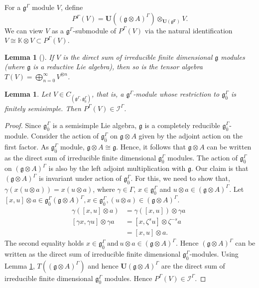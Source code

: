 \documentclass[11pt]{amsart}
\theoremstyle{plain}
\newtheorem{lemma}[thm]{Lemma}
\theoremstyle{definition}
\newcommand{\g}{\mathfrak{g}}
\begin{document}
 For a $\g^{\Gamma}$ module $V$, define 
 \begin{equation}
     P{^\Gamma}(V)=\mathbf{U}((\g\otimes A)^\Gamma)\otimes_{\mathbf{U(\g^{\Gamma})}}V. 
 \end{equation}
 We can view $V$ as a $\g^{\Gamma}$-submodule of $P^\Gamma(V)$ via the natural identification $V\cong \mathbb{K}\otimes V\subset P^\Gamma(V)$.
\begin{lemma}[\cite{FMS15}]\label{lem:14}
If $V$ is the direct sum of irreducible finite dimensional $\g$ modules (where $\g$ is a reductive Lie algebra), then so is the tensor algebra $T(V)=\bigoplus_{n=0}^{\infty}V^{\otimes n}$.
\end{lemma}
 \begin{lemma}
 Let $V\in C_{(\g^{\Gamma},\g_{\bar{0}}^{\Gamma})}$, that is, a  $\g^{\Gamma}$-module whose restriction to $\g_{\bar{0}}^{\Gamma}$ is finitely semisimple. Then $P^\Gamma(V)\in\mathcal{I}^\Gamma$. 
 \end{lemma}
 \begin{proof}
Since $\g_{\bar{0}}^{\Gamma}$ is a semisimple Lie algebra, $\g$ is a completely reducible $\g_{\bar{0}}^{\Gamma}$-module. Consider the action of $\g_{\bar{0}}^{\Gamma}$ on $\g\otimes A$ given by the adjoint action on the first factor. As $\g_{\bar{0}}^{\Gamma}$ module, $\g\otimes A\cong\g$. Hence, it follows that $\g\otimes A$ can be written as the direct sum of irreducible finite dimensional $\g_{\bar{0}}^{\Gamma}$ modules. The action of $\g_{\bar{0}}^{\Gamma}$ on $(\g\otimes A)^{\Gamma}$ is also by the left adjoint multiplication with $\g$. Our claim is that $(\g\otimes A)^\Gamma$ is invariant under action of $\g_{\bar{0}}^{\Gamma}$. For this, we need to show that, $\gamma(x(u\otimes a))=x(u\otimes a)$, where $\gamma\in\Gamma$, $x\in\g_{\bar{0}}^{\Gamma}$ and $u\otimes a\in (\g\otimes A)^{\Gamma}$. Let $[x,u]\otimes a\in\g_{\bar{0}}^{\Gamma}(\g\otimes A)^{\Gamma},  x\in\g_{\bar{0}}^{\Gamma}, (u\otimes a)\in(\g\otimes A)^{\Gamma}$.
\begin{align*}
  \gamma([x,u]\otimes a)&=\gamma([x,u])\otimes\gamma a \\
  [\gamma x,\gamma u]\otimes\gamma a&=[x,\zeta^{s}u]\otimes\zeta^{-s}a\quad \\
  &=[x,u]\otimes a.
\end{align*}
The second equality holds $x\in\g_{\bar{0}}^{\Gamma}~\mbox{and}~u\otimes a\in(\g\otimes A)^{\Gamma}$.
Hence $(\g\otimes A)^{\Gamma}$ can be written as the direct sum of irreducible finite dimensional $\g_{\bar{0}}^{\Gamma}$-modules. Using Lemma \ref{lem:14}, $T((\g\otimes A)^\Gamma)$ and hence $\mathbf{U}(\g\otimes A)^\Gamma$ are the direct sum of irreducible finite dimensional $\g_{\bar{0}}^{\Gamma}$ modules. Hence $P^\Gamma(V)\in\mathcal{I}^\Gamma$.
 \end{proof}
\end{document}
